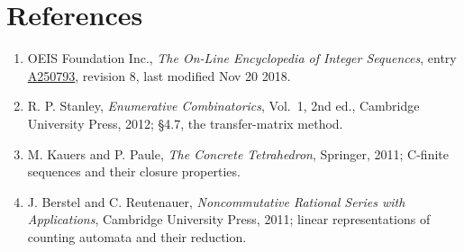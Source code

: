 \documentclass[11pt]{article}
\theoremstyle{definition}
\begin{document}
\section{References}

\begin{enumerate}

\item OEIS Foundation Inc., \emph{The On-Line Encyclopedia of Integer Sequences}, entry \href{https://oeis.org/A250793}{A250793}, revision 8, last modified Nov 20 2018.

\item R. P. Stanley, \emph{Enumerative Combinatorics}, Vol.~1, 2nd ed., Cambridge University Press, 2012; \S4.7, the transfer-matrix method.

\item M. Kauers and P. Paule, \emph{The Concrete Tetrahedron}, Springer, 2011; C-finite sequences and their closure properties.

\item J. Berstel and C. Reutenauer, \emph{Noncommutative Rational Series with Applications}, Cambridge University Press, 2011; linear representations of counting automata and their reduction.

\end{enumerate}
\end{document}
